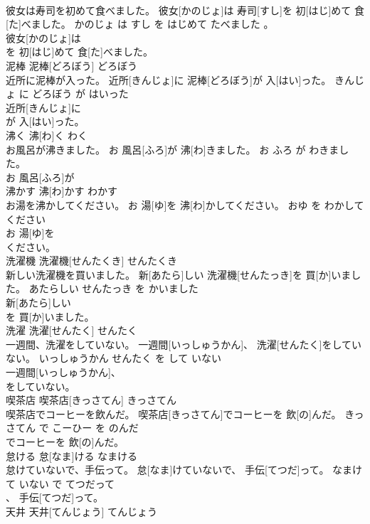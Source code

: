 \documentclass[8pt]{extreport}
\begin{document}
\begin{CJK}{UTF8}{min}
\\	彼女は寿司を初めて食べました。	彼女[かのじょ]は 寿司[すし]を 初[はじ]めて 食[た]べました。	かのじょ は すし を はじめて たべました 。	
\\	彼女[かのじょ]は
\\	を 初[はじ]めて 食[た]べました。			
\\	泥棒	泥棒[どろぼう]	どろぼう	
\\	近所に泥棒が入った。	近所[きんじょ]に 泥棒[どろぼう]が 入[はい]った。	きんじょ に どろぼう が はいった	
\\	近所[きんじょ]に
\\	が 入[はい]った。			
\\	沸く	沸[わ]く	わく	
\\	お風呂が沸きました。	お 風呂[ふろ]が 沸[わ]きました。	お ふろ が わきました。	
\\	お 風呂[ふろ]が
\\	沸かす	沸[わ]かす	わかす	
\\	お湯を沸かしてください。	お 湯[ゆ]を 沸[わ]かしてください。	おゆ を わかして ください	
\\	お 湯[ゆ]を
\\	ください。			
\\	洗濯機	洗濯機[せんたくき]	せんたくき	
\\	新しい洗濯機を買いました。	新[あたら]しい 洗濯機[せんたっき]を 買[か]いました。	あたらしい せんたっき を かいました	
\\	新[あたら]しい
\\	を 買[か]いました。			
\\	洗濯	洗濯[せんたく]	せんたく	
\\	一週間、洗濯をしていない。	一週間[いっしゅうかん]、 洗濯[せんたく]をしていない。	いっしゅうかん せんたく を して いない	
\\	一週間[いっしゅうかん]、
\\	をしていない。			
\\	喫茶店	喫茶店[きっさてん]	きっさてん	
\\	喫茶店でコーヒーを飲んだ。	喫茶店[きっさてん]でコーヒーを 飲[の]んだ。	きっさてん で こーひー を のんだ	
\\	でコーヒーを 飲[の]んだ。			
\\	怠ける	怠[なま]ける	なまける	
\\	怠けていないで、手伝って。	怠[なま]けていないで、 手伝[てつだ]って。	なまけて いない で てつだって	
\\	、 手伝[てつだ]って。			
\\	天井	天井[てんじょう]	てんじょう	

\end{CJK}
\end{document}
